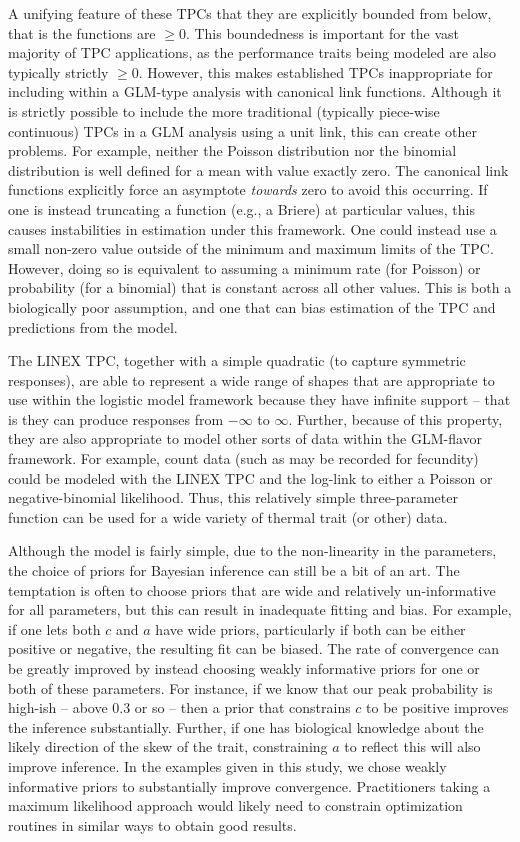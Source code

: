 \documentclass[
  11pt,
  letterpaper,
]{article}
\begin{document}
A unifying feature of these TPCs that they are explicitly bounded from
below, that is the functions are \(\geq 0\). This boundedness is
important for the vast majority of TPC applications, as the performance
traits being modeled are also typically strictly \(\geq 0\). However,
this makes established TPCs inappropriate for including within a
GLM-type analysis with canonical link functions. Although it is strictly
possible to include the more traditional (typically piece-wise
continuous) TPCs in a GLM analysis using a unit link, this can create
other problems. For example, neither the Poisson distribution nor the
binomial distribution is well defined for a mean with value exactly
zero. The canonical link functions explicitly force an asymptote
\emph{towards} zero to avoid this occurring. If one is instead
truncating a function (e.g., a Briere) at particular values, this causes
instabilities in estimation under this framework. One could instead use
a small non-zero value outside of the minimum and maximum limits of the
TPC. However, doing so is equivalent to assuming a minimum rate (for
Poisson) or probability (for a binomial) that is constant across all
other values. This is both a biologically poor assumption, and one that
can bias estimation of the TPC and predictions from the model.

The LINEX TPC, together with a simple quadratic (to capture symmetric
responses), are able to represent a wide range of shapes that are
appropriate to use within the logistic model framework because they have
infinite support -- that is they can produce responses from \(-\infty\)
to \(\infty\). Further, because of this property, they are also
appropriate to model other sorts of data within the GLM-flavor
framework. For example, count data (such as may be recorded for
fecundity) could be modeled with the LINEX TPC and the log-link to
either a Poisson or negative-binomial likelihood. Thus, this relatively
simple three-parameter function can be used for a wide variety of
thermal trait (or other) data.

Although the model is fairly simple, due to the non-linearity in the
parameters, the choice of priors for Bayesian inference can still be a
bit of an art. The temptation is often to choose priors that are wide
and relatively un-informative for all parameters, but this can result in
inadequate fitting and bias. For example, if one lets both \(c\) and
\(a\) have wide priors, particularly if both can be either positive or
negative, the resulting fit can be biased. The rate of convergence can
be greatly improved by instead choosing weakly informative priors for
one or both of these parameters. For instance, if we know that our peak
probability is high-ish -- above 0.3 or so -- then a prior that
constrains \(c\) to be positive improves the inference substantially.
Further, if one has biological knowledge about the likely direction of
the skew of the trait, constraining \(a\) to reflect this will also
improve inference. In the examples given in this study, we chose weakly
informative priors to substantially improve convergence. Practitioners
taking a maximum likelihood approach would likely need to constrain
optimization routines in similar ways to obtain good results.
\end{document}
